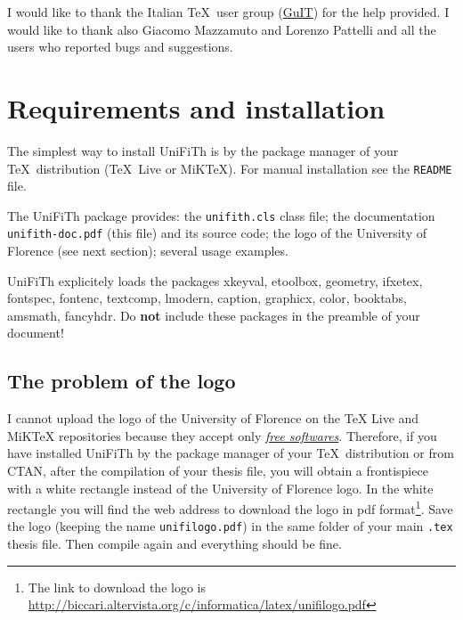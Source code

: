 \documentclass[a5paper,11pt]{article}
\begin{document}
I would like to thank the Italian \TeX\ user group (\href{http://www.guitex.org/}{GuIT}) for the help provided. I would like to thank also Giacomo Mazzamuto and Lorenzo Pattelli and all the users who reported bugs and suggestions.

\section[Requirements\\ and installation]{Requirements and installation}
\label{requirements_installation}

The simplest way to install \textsf{UniFiTh} is by the package manager of 
your \TeX\ distribution (\TeX\ Live or MiK\TeX). For manual installation see 
the \texttt{README} file. 

The \textsf{UniFiTh} package provides: the 
\texttt{unifith.cls} class file; the documentation 
\texttt{unifith-doc.pdf} (this file) and its source code; the logo of the 
University of Florence (see next section); several usage examples.


\textsf{UniFiTh} explicitely loads the packages \textsf{xkeyval}, \textsf{etoolbox}, \textsf{geometry}, \textsf{ifxetex}, \textsf{fontspec}, \textsf{fontenc}, \textsf{textcomp}, \textsf{lmodern}, \textsf{caption}, \textsf{graphicx}, \textsf{color}, \textsf{booktabs}, \textsf{amsmath}, \textsf{fancyhdr}.
Do \textbf{not} include these packages in the preamble of your document!


\subsection[The problem of the logo]{The problem of the logo}
\label{logo_problem}

I cannot upload the logo of the University of Florence on the TeX Live and MiKTeX repositories because they accept only \href{https://en.wikipedia.org/wiki/Free_software}{\emph{free softwares}}. Therefore, if you have installed \textsf{UniFiTh} by the package manager of your \TeX\ distribution or from CTAN, after the compilation of your thesis file, you will obtain a frontispiece with a white rectangle instead of the University of Florence logo. In the white rectangle you will find the web address to download the logo in pdf format\footnote{The link to download the logo is \url{http://biccari.altervista.org/c/informatica/latex/unifilogo.pdf}}. Save the logo (keeping the name \texttt{unifilogo.pdf}) in the same folder of your main \texttt{.tex} thesis file. Then compile again and everything should be fine. 
\end{document}
